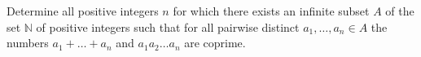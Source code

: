Determine all positive integers $n$ for which there exists an infinite subset $A$ of the set $\mathbb{N}$ of positive integers such that for all pairwise distinct $a_1,\ldots , a_n \in A$ the numbers $a_1+\ldots +a_n$ and $a_1a_2\ldots a_n$ are coprime.